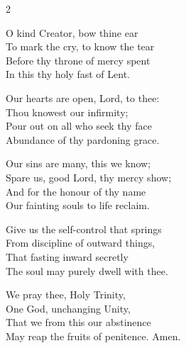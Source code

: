 \begin{multicols}{2}
\begin{enpars}
O kind Creator, bow thine ear\\
To mark the cry, to know the tear\\
Before thy throne of mercy spent\\
In this thy holy fast of Lent.

Our hearts are open, Lord, to thee:\\
Thou knowest our infirmity;\\
Pour out on all who seek thy face\\
Abundance of thy pardoning grace.

Our sins are many, this we know;\\
Spare us, good Lord, thy mercy show;\\
And for the honour of thy name\\
Our fainting souls to life reclaim.

Give us the self-control that springs\\
From discipline of outward things,\\
That fasting inward secretly\\
The soul may purely dwell with thee.

We pray thee, Holy Trinity,\\
One God, unchanging Unity,\\
That we from this our abstinence\\
May reap the fruits of penitence. Amen.
\end{enpars}
\end{multicols}
